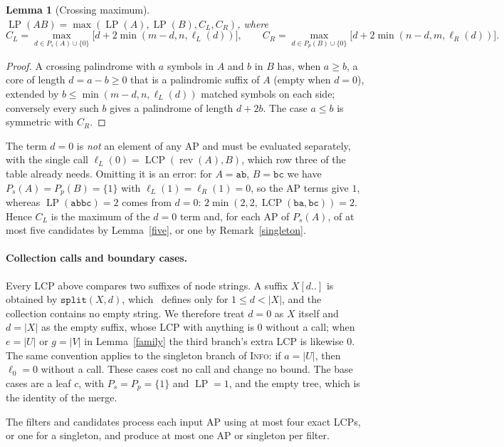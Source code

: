 ﻿\documentclass[11pt]{article}
\theoremstyle{plain}
\newtheorem{lemma}[theorem]{Lemma}
\theoremstyle{remark}
\begin{document}
\begin{lemma}[Crossing maximum]\label{crossmax}
$\operatorname{LP}(AB)=\max(\operatorname{LP}(A),\operatorname{LP}(B),C_L,C_R)$, where
\[
C_L=\max_{d\in P_s(A)\cup\{0\}}\bigl[d+2\min(m-d,n,\ell_L(d))\bigr],\qquad
C_R=\max_{d\in P_p(B)\cup\{0\}}\bigl[d+2\min(n-d,m,\ell_R(d))\bigr].
\]
\end{lemma}
\begin{proof}
A crossing palindrome with $a$ symbols in $A$ and $b$ in $B$ has, when $a\ge b$, a core of length $d=a-b\ge0$ that is a palindromic suffix of $A$ (empty when $d=0$), extended by $b\le\min(m-d,n,\ell_L(d))$ matched symbols on each side; conversely every such $b$ gives a palindrome of length $d+2b$. The case $a\le b$ is symmetric with $C_R$.
\end{proof}
The term $d=0$ is \emph{not} an element of any AP and must be evaluated separately, with the single call $\ell_L(0)=\operatorname{LCP}(\operatorname{rev}(A),B)$, which row three of the table already needs. Omitting it is an error: for $A=\texttt{ab}$, $B=\texttt{bc}$ we have $P_s(A)=P_p(B)=\{1\}$ with $\ell_L(1)=\ell_R(1)=0$, so the AP terms give $1$, whereas $\operatorname{LP}(\texttt{abbc})=2$ comes from $d=0$: $2\min(2,2,\operatorname{LCP}(\texttt{ba},\texttt{bc}))=2$. Hence $C_L$ is the maximum of the $d=0$ term and, for each AP of $P_s(A)$, of at most five candidates by Lemma~\ref{five}, or one by Remark~\ref{singleton}.

\paragraph{Collection calls and boundary cases.} Every LCP above compares two suffixes of node strings. A suffix $X[d..]$ is obtained by $\texttt{split}(X,d)$, which~\cite[\S3]{GKK} defines only for $1\le d<|X|$, and the collection contains no empty string. We therefore treat $d=0$ as $X$ itself and $d=|X|$ as the empty suffix, whose LCP with anything is $0$ without a call; when $e=|U|$ or $g=|V|$ in Lemma~\ref{family} the third branch's extra LCP is likewise $0$. The same convention applies to the singleton branch of \textsc{Info}: if $a=|U|$, then $\ell_0=0$ without a call. These cases cost no call and change no bound. The base cases are a leaf $c$, with $P_s=P_p=\{1\}$ and $\operatorname{LP}=1$, and the empty tree, which is the identity of the merge.

The filters and candidates process each input AP using at most four exact LCPs, or one for a singleton, and produce at most one AP or singleton per filter.
\end{document}
